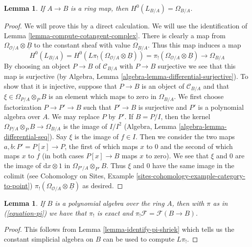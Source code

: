 \documentclass{stacks-project}
\theoremstyle{plain}
\newtheorem{lemma}[subsection]{Lemma}
\theoremstyle{definition}
\theoremstyle{remark}
\numberwithin{equation}{subsection}
\begin{document}
\begin{lemma}
\label{lemma-identify-H0}
If $A \to B$ is a ring map, then $H^0(L_{B/A}) = \Omega_{B/A}$.
\end{lemma}

\begin{proof}
We will prove this by a direct calculation.
We will use the identification of Lemma \ref{lemma-compute-cotangent-complex}.
There is clearly a map from $\Omega_{\mathcal{O}/A} \otimes \underline{B}$
to the constant sheaf with value $\Omega_{B/A}$. Thus this map induces
a map
$$
H^0(L_{B/A}) = H^0(L\pi_!(\Omega_{\mathcal{O}/A} \otimes \underline{B}))
= \pi_!(\Omega_{\mathcal{O}/A} \otimes \underline{B}) \to \Omega_{B/A}
$$
By choosing an object $P \to B$ of $\mathcal{C}_{B/A}$ with $P \to B$
surjective we see that this map is surjective (by
Algebra, Lemma \ref{algebra-lemma-differential-surjective}).
To show that it is injective, suppose that $P \to B$ is an object
of $\mathcal{C}_{B/A}$ and that $\xi \in \Omega_{P/A} \otimes_P B$
is an element which maps to zero in $\Omega_{B/A}$.
We first choose factorization $P \to P' \to B$ such that $P' \to B$
is surjective and $P'$ is a polynomial algebra over $A$.
We may replace $P$ by $P'$. If $B = P/I$, then the kernel
$\Omega_{P/A} \otimes_P B \to \Omega_{B/A}$ is the image of
$I/I^2$ (Algebra, Lemma \ref{algebra-lemma-differential-seq}).
Say $\xi$ is the image of $f \in I$.
Then we consider the two maps $a, b : P' = P[x] \to P$, the first of which
maps $x$ to $0$ and the second of which maps $x$ to $f$ (in both
cases $P[x] \to B$ maps $x$ to zero). We see that $\xi$ and $0$
are the image of $\text{d}x \otimes 1$ in $\Omega_{P'/A} \otimes_{P'} B$.
Thus $\xi$ and $0$ have the same image in the colimit (see
Cohomology on Sites, Example \ref{sites-cohomology-example-category-to-point})
$\pi_!(\Omega_{\mathcal{O}/A} \otimes \underline{B})$ as desired.
\end{proof}

\begin{lemma}
\label{lemma-pi-lower-shriek-polynomial-algebra}
If $B$ is a polynomial algebra over the ring $A$, then
with $\pi$ as in (\ref{equation-pi}) we have that
$\pi_!$ is exact and $\pi_!\mathcal{F} = \mathcal{F}(B \to B)$.
\end{lemma}

\begin{proof}
This follows from Lemma \ref{lemma-identify-pi-shriek} which tells us
the constant simplicial algebra on $B$ can be used to compute $L\pi_!$.
\end{proof}
\end{document}
